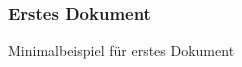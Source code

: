 \begin{frame}
    \frametitle{Erstes Dokument}
    \begin{block}{Minimalbeispiel für erstes Dokument}
        
    \end{block}
\end{frame}

